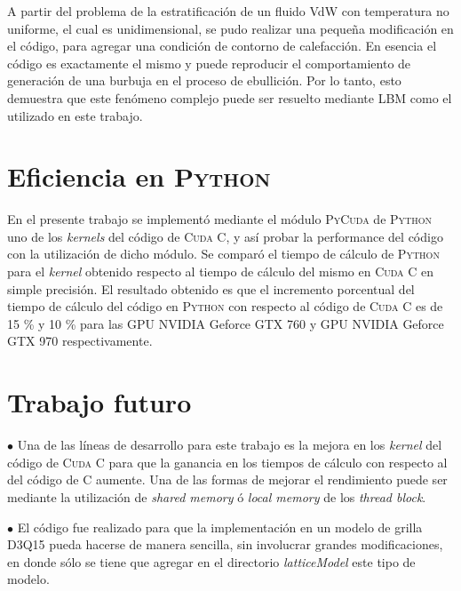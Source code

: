 A partir del problema de la estratificación de un fluido VdW con temperatura no uniforme, el cual es unidimensional, se pudo realizar una pequeña modificación en el código, para agregar una condición de contorno de calefacción. En esencia el código es exactamente el mismo y puede reproducir el comportamiento de generación de una burbuja en el proceso de ebullición. Por lo tanto, esto demuestra que este fenómeno complejo puede ser resuelto mediante LBM como el utilizado en este trabajo.

\newpage

\section{Eficiencia en \textsc{Python}}

En el presente trabajo se implementó mediante el módulo \textsc{PyCuda} de \textsc{Python} uno de los \textit{kernels} del código de \textsc{Cuda C}, y así probar la performance del código con la utilización de dicho módulo. Se comparó el tiempo de cálculo de \textsc{Python} para el \textit{kernel} obtenido respecto al tiempo de cálculo del mismo en \textsc{Cuda C} en simple precisión. El resultado obtenido es que el incremento porcentual del tiempo de cálculo del código en \textsc{Python} con respecto al código de \textsc{Cuda C} es de 15 \% y 10 \% para las GPU NVIDIA Geforce GTX 760 y GPU NVIDIA Geforce GTX 970 respectivamente.

\section{Trabajo futuro}

$\bullet$ Una de las líneas de desarrollo para este trabajo es la mejora en los \textit{kernel} del código de \textsc{Cuda C} para que la ganancia en los tiempos de cálculo con respecto al del código de \textsc{C} aumente. Una de las formas de mejorar el rendimiento puede ser mediante la utilización de \textit{shared memory} ó \textit{local memory} de los \textit{thread block}. 

$\bullet$ El código fue realizado para que la implementación en un modelo de grilla D3Q15 pueda hacerse de manera sencilla, sin involucrar grandes modificaciones, en donde sólo se tiene que agregar en el directorio \textit{latticeModel} este tipo de modelo. 


%
%

